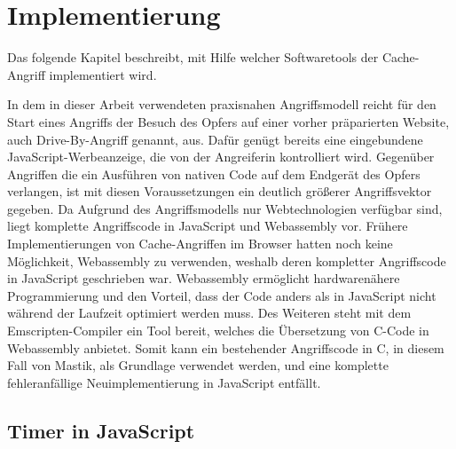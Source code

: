 \chapter{Implementierung}
\label{chapter:preparation}


Das folgende Kapitel beschreibt, mit Hilfe welcher Softwaretools der Cache-Angriff implementiert wird.

In dem in dieser Arbeit verwendeten praxisnahen Angriffsmodell reicht für den Start eines Angriffs der Besuch des Opfers auf einer vorher präparierten Website, auch Drive-By-Angriff genannt, aus. 
Dafür genügt bereits eine eingebundene JavaScript-Werbeanzeige, die von der Angreiferin kontrolliert wird. 
Gegenüber Angriffen die ein Ausführen von nativen Code auf dem Endgerät des Opfers verlangen, ist mit diesen Voraussetzungen ein deutlich größerer Angriffsvektor gegeben.
Da Aufgrund des Angriffsmodells nur Webtechnologien verfügbar sind, liegt komplette Angriffscode in JavaScript und Webassembly vor. 
Frühere Implementierungen von Cache-Angriffen im Browser \cite{TheSpyInTheSandbox} hatten noch keine Möglichkeit, Webassembly zu verwenden, weshalb deren kompletter Angriffscode in JavaScript geschrieben war. 
Webassembly ermöglicht hardwarenähere Programmierung und den Vorteil, dass der Code anders als in JavaScript nicht während der Laufzeit optimiert werden muss. 
Des Weiteren steht mit dem Emscripten-Compiler ein Tool bereit, welches die Übersetzung von C-Code in Webassembly anbietet. Somit kann ein bestehender Angriffscode in C, in diesem Fall von Mastik, als Grundlage verwendet werden, und eine komplette fehleranfällige Neuimplementierung in JavaScript entfällt.

\section{Timer in JavaScript}

